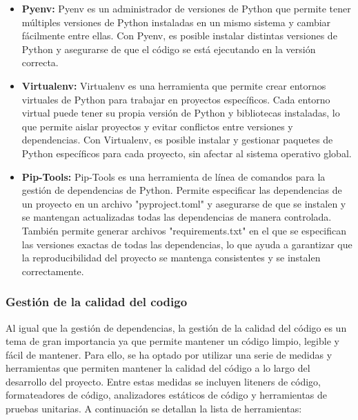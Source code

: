 \begin{itemize}
    \item \textbf{Pyenv: } Pyenv es un administrador 
    de versiones de Python que permite tener múltiples versiones de Python instaladas en un mismo sistema 
    y cambiar fácilmente entre ellas. Con Pyenv, es posible instalar distintas versiones de 
    Python y asegurarse de que el código se está ejecutando en la versión correcta. 
    
    
    \item \textbf{Virtualenv: } Virtualenv es una herramienta que permite crear entornos virtuales de Python para trabajar 
    en proyectos específicos. Cada entorno virtual puede tener su propia versión de Python y bibliotecas instaladas, 
    lo que permite aislar proyectos y evitar conflictos entre versiones y dependencias. Con Virtualenv, 
    es posible instalar y gestionar paquetes de Python específicos para cada proyecto, sin afectar 
    al sistema operativo global.

    \item \textbf{Pip-Tools: } Pip-Tools es una herramienta de línea de comandos para la gestión de 
    dependencias de Python. Permite especificar las dependencias de un proyecto en un archivo 
    "pyproject.toml" y asegurarse de que se instalen y se mantengan actualizadas todas las dependencias 
    de manera controlada. También permite generar archivos "requirements.txt" en el que se especifican las 
    versiones exactas de todas las dependencias, lo que ayuda a garantizar que la reproducibilidad del 
    proyecto se mantenga consistentes y se instalen correctamente.

\end{itemize}


\subsubsection{Gestión de la calidad del codigo}
Al igual que la gestión de dependencias, la gestión de la calidad del código es un tema de gran importancia
ya que permite mantener un código limpio, legible y fácil de mantener. Para ello, se ha optado por utilizar
una serie de medidas y herramientas que permiten mantener la calidad del código a lo largo del desarrollo del proyecto.
Entre estas medidas se incluyen liteners de código, formateadores de código, analizadores estáticos de código y
herramientas de pruebas unitarias. A continuación se detallan la lista de herramientas:

